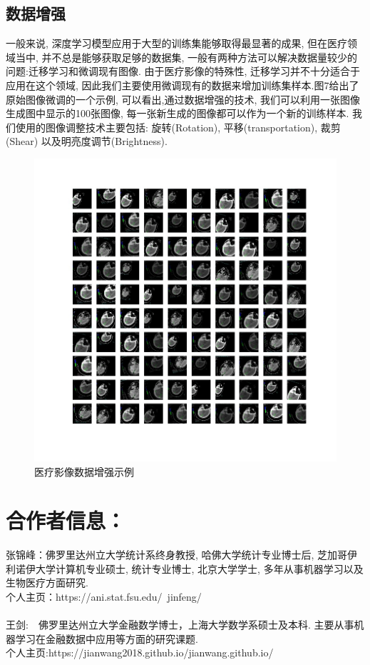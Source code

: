 \documentclass[12pt]{article}
\begin{document}
\begin{CJK*}{UTF8}{gbsn}
\subsection{数据增强}
一般来说, 深度学习模型应用于大型的训练集能够取得最显著的成果, 但在医疗领域当中, 并不总是能够获取足够的数据集, 一般有两种方法可以解决数据量较少的问题:迁移学习和微调现有图像. 由于医疗影像的特殊性, 迁移学习并不十分适合于应用在这个领域, 因此我们主要使用微调现有的数据来增加训练集样本.图7给出了原始图像微调的一个示例, 可以看出,通过数据增强的技术, 我们可以利用一张图像生成图中显示的100张图像, 每一张新生成的图像都可以作为一个新的训练样本. 我们使用的图像调整技术主要包括: 旋转(Rotation), 平移(transportation), 裁剪(Shear) 以及明亮度调节(Brightness).


\begin{figure}[H]
\centering
\includegraphics[width=1.2\textwidth]{augumentation.jpg}
\caption{医疗影像数据增强示例}
\label{fig:fig7}
\end{figure}

\section{合作者信息：}
张锦峰：佛罗里达州立大学统计系终身教授,    哈佛大学统计专业博士后,      
芝加哥伊利诺伊大学计算机专业硕士,    统计专业博士,     北京大学学士,     多年从事机器学习以及生物医疗方面研究.\\
个人主页：https://ani.stat.fsu.edu/~jinfeng/\\
\\
王剑:　佛罗里达州立大学金融数学博士，上海大学数学系硕士及本科. 主要从事机器学习在金融数据中应用等方面的研究课题.\\
个人主页:https://jianwang2018.github.io/jianwang.github.io/





\clearpage\end{CJK*}




\end{document}
